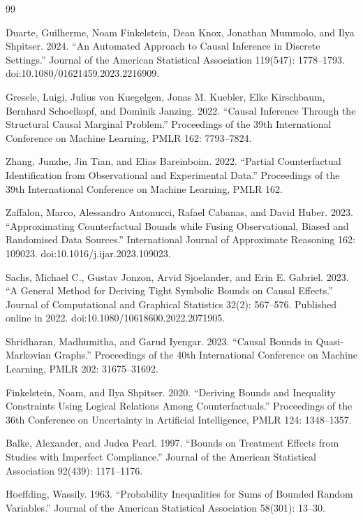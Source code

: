 \documentclass{article}
\begin{document}
\begin{thebibliography}{99}

   Duarte, Guilherme, Noam Finkelstein, Dean Knox, Jonathan Mummolo, and Ilya Shpitser. 2024. ``An Automated Approach to Causal Inference in Discrete Settings.'' Journal of the American Statistical Association 119(547): 1778--1793. doi:10.1080/01621459.2023.2216909.

   Gresele, Luigi, Julius von Kuegelgen, Jonas M. Kuebler, Elke Kirschbaum, Bernhard Schoelkopf, and Dominik Janzing. 2022. ``Causal Inference Through the Structural Causal Marginal Problem.'' Proceedings of the 39th International Conference on Machine Learning, PMLR 162: 7793--7824.

   Zhang, Junzhe, Jin Tian, and Elias Bareinboim. 2022. ``Partial Counterfactual Identification from Observational and Experimental Data.'' Proceedings of the 39th International Conference on Machine Learning, PMLR 162.

   Zaffalon, Marco, Alessandro Antonucci, Rafael Cabanas, and David Huber. 2023. ``Approximating Counterfactual Bounds while Fusing Observational, Biased and Randomised Data Sources.'' International Journal of Approximate Reasoning 162: 109023. doi:10.1016/j.ijar.2023.109023.

   Sachs, Michael C., Gustav Jonzon, Arvid Sjoelander, and Erin E. Gabriel. 2023. ``A General Method for Deriving Tight Symbolic Bounds on Causal Effects.'' Journal of Computational and Graphical Statistics 32(2): 567--576. Published online in 2022. doi:10.1080/10618600.2022.2071905.

   Shridharan, Madhumitha, and Garud Iyengar. 2023. ``Causal Bounds in Quasi-Markovian Graphs.'' Proceedings of the 40th International Conference on Machine Learning, PMLR 202: 31675--31692.

   Finkelstein, Noam, and Ilya Shpitser. 2020. ``Deriving Bounds and Inequality Constraints Using Logical Relations Among Counterfactuals.'' Proceedings of the 36th Conference on Uncertainty in Artificial Intelligence, PMLR 124: 1348--1357.

   Balke, Alexander, and Judea Pearl. 1997. ``Bounds on Treatment Effects from Studies with Imperfect Compliance.'' Journal of the American Statistical Association 92(439): 1171--1176.

   Hoeffding, Wassily. 1963. ``Probability Inequalities for Sums of Bounded Random Variables.'' Journal of the American Statistical Association 58(301): 13--30.

\end{thebibliography}
\end{document}
